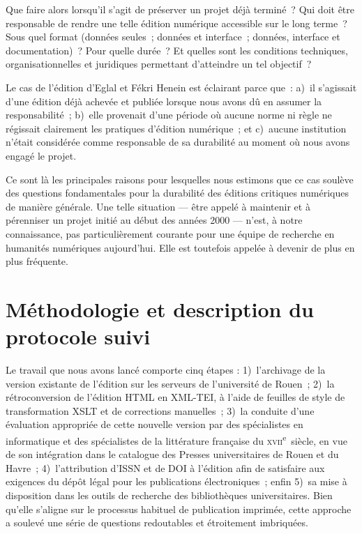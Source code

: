 \documentclass[final,fra]{anthology-ch} %
\begin{document}
Que faire alors lorsqu'il s'agit de préserver un projet déjà terminé~?
Qui doit être responsable de rendre une telle édition numérique
accessible sur le long terme~? Sous quel format (données seules~;
données et interface~; données, interface et documentation)~? Pour
quelle durée~? Et quelles sont les conditions techniques,
organisationnelles et juridiques permettant d'atteindre un tel
objectif~?

Le cas de l'édition d'Eglal et Fékri Henein est éclairant parce que~:
a)~il s'agissait d'une édition déjà achevée et publiée lorsque nous
avons dû en assumer la responsabilité~; b)~elle provenait d'une période
où aucune norme ni règle ne régissait clairement les pratiques d'édition
numérique~; et c)~aucune institution n'était considérée comme
responsable de sa durabilité au moment où nous avons engagé le projet.

Ce sont là les principales raisons pour lesquelles nous estimons que ce
cas soulève des questions fondamentales pour la durabilité des éditions
critiques numériques de manière générale. Une telle situation --- être
appelé à maintenir et à pérenniser un projet initié au début des années
2000 --- n'est, à notre connaissance, pas particulièrement courante pour
une équipe de recherche en humanités numériques aujourd'hui. Elle est
toutefois appelée à devenir de plus en plus fréquente.

\section{Méthodologie et description du protocole
suivi}\label{muxe9thodologie-et-description-du-protocole-suivi}

Le travail que nous avons lancé comporte cinq étapes : 1)~l'archivage de
la version existante de l'édition sur les serveurs de l'université de
Rouen~; 2)~la rétroconversion de l'édition HTML en XML-TEI, à l'aide de
feuilles de style de transformation XSLT et de corrections manuelles~;
3)~la conduite d'une évaluation appropriée de cette nouvelle version par
des spécialistes en informatique et des spécialistes de la littérature
française du \textsc{xvii}\textsuperscript{e}~siècle, en vue de son intégration dans le catalogue
des Presses universitaires de Rouen et du Havre~; 4)~l'attribution
d'ISSN et de DOI à l'édition afin de satisfaire aux exigences du dépôt
légal pour les publications électroniques~; enfin 5)~sa mise à
disposition dans les outils de recherche des bibliothèques
universitaires. Bien qu'elle s'aligne sur le processus habituel de
publication imprimée, cette approche a soulevé une série de questions
redoutables et étroitement imbriquées.
\end{document}
